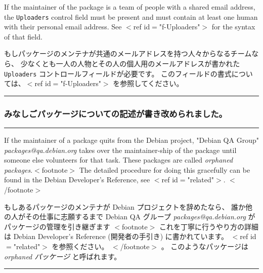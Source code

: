 \documentclass[mingoth,a4paper]{jsarticle}
\begin{document}
\par
\parbox[t]{0.48\linewidth}{
	  If the maintainer of the package is a team of people with a
	  shared email address, the {\tt Uploaders} control field must
	  be present and must contain at least one human with their
	  personal email address.  See $<$ref id$=$"f-Uploaders"$>$ for the
	  syntax of that field.
}\hfil 
\parbox[t]{0.48\linewidth}{
	    もしパッケージのメンテナが共通のメールアドレスを持つ人々からなるチームなら、
	    少なくとも一人の人物とその人の個人用のメールアドレスが書かれた
	    {\tt Uploaders} コントロールフィールドが必要です。
	    このフィールドの書式については、$<$ref id$=$"f-Uploaders"$>$ を参照してください。
}
\hrule
\vspace{1ex}


\subsubsection{みなしごパッケージについての記述が書き改められました。}

\vspace*{1ex}
\hrule
{}\par
\parbox[t]{0.48\linewidth}{
	  If the maintainer of a package quits from the Debian
	  project, "Debian QA Group"
	  {\it packages@qa.debian.org} takes over the
	  maintainer-ship of the package until someone else
	  volunteers for that task. These packages are called
	  {\em orphaned packages}.$<$footnote$>$
		The detailed procedure for doing this gracefully can
		be found in the Debian Developer's Reference,
		see $<$ref id$=$"related"$>$.
	  $<$/footnote$>$
}\hfil 
\parbox[t]{0.48\linewidth}{
	    もしあるパッケージのメンテナが Debian プロジェクトを辞めたなら、
	    誰か他の人がその仕事に志願するまで Debian QA グループ
	    {\it packages@qa.debian.org}
	    がパッケージの管理を引き継ぎます
	    $<$footnote$>$
		これを丁寧に行うやり方の詳細は Debian Developer's
		Reference (開発者の手引き) に書かれています。
		$<$ref id$=$"related"$>$ を参照ください。
	    $<$/footnote$>$ 。
	    このようなパッケージは {\em orphaned パッケージ}
	    と呼ばれます。
}
\hrule
\end{document}
